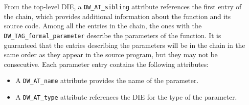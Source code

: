 From the top-level DIE, a \verb|DW_AT_sibling| attribute references the first
entry of the chain, which provides additional information about the function
and its source code. Among all the entries in the chain, the ones with the
\verb|DW_TAG_formal_parameter| describe the parameters of the function. It is
guaranteed that the entries describing the parameters will be in the chain in
the same order as they appear in the source program, but they may not be
consecutive. Each parameter entry contains the following attributes:

\begin{itemize}
  \item A \verb|DW_AT_name| attribute provides the name of the parameter.
  \item A \verb|DW_AT_type| attribute references the DIE for the type of
    the parameter.
\end{itemize}


\beforeintro
